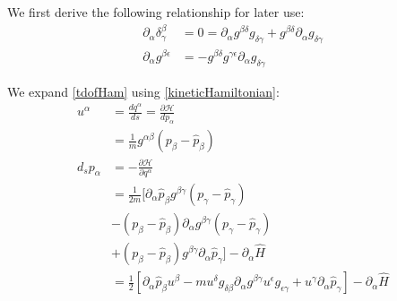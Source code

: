 \documentclass[aps,pra,10pt,twocolumn,floatfix,nofootinbib]{revtex4-1}
\theoremstyle{definition}
\begin{document}
We first derive the following relationship for later use:
\begin{align*}
\partial_\alpha \delta^\beta_\gamma &= 0 = \partial_\alpha g^{\beta\delta} g_{\delta\gamma} + g^{\beta\delta} \partial_\alpha g_{\delta\gamma}\\
\partial_\alpha g^{\beta\epsilon} &= - g^{\beta\delta} g^{\gamma\epsilon} \partial_\alpha g_{\delta\gamma}
\end{align*}

We expand \ref{tdofHam} using \ref{kineticHamiltonian}:
\begin{align*}
u^\alpha &= \frac{dq^\alpha}{ds} = \frac{\partial \mathcal{H}}{dp_\alpha} \\
&= \frac{1}{m}g^{\alpha\beta}(p_\beta-\hat{p}_\beta) \\
d_s p_\alpha &= - \frac{\partial \mathcal{H}}{\partial q^\alpha} \\
&=\frac{1}{2m}[\partial_\alpha \hat{p}_\beta g^{\beta \gamma} (p_\gamma -\hat{p}_\gamma) \\
 &- (p_\beta -\hat{p}_\beta) \partial_\alpha g^{\beta \gamma} (p_\gamma -\hat{p}_\gamma) \\
 &+ (p_\beta -\hat{p}_\beta) g^{\beta \gamma} \partial_\alpha \hat{p}_\gamma ]- \partial_\alpha \hat{H} \\
&=\frac{1}{2}[\partial_\alpha \hat{p}_\beta u^\beta
- m u^\delta g_{\delta\beta} \partial_\alpha g^{\beta \gamma} u^\epsilon g_{\epsilon\gamma}
+ u^\gamma \partial_\alpha \hat{p}_\gamma ]- \partial_\alpha \hat{H}
\end{align*}
\end{document}
